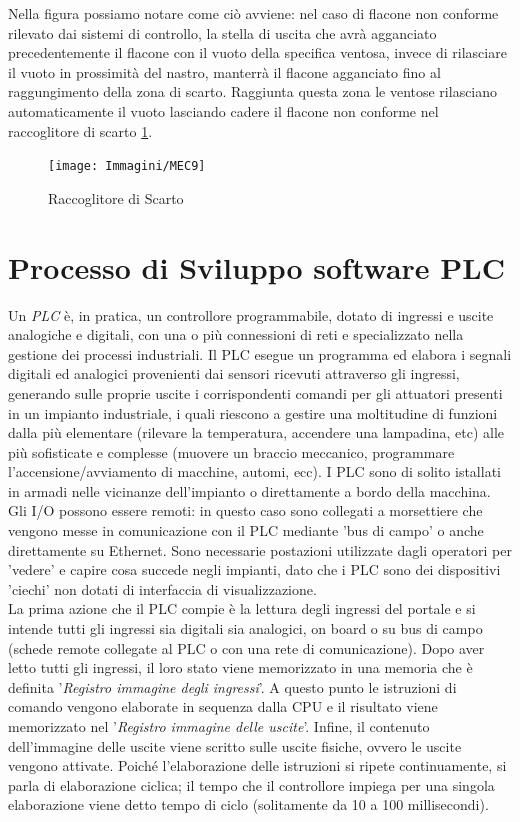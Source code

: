\documentclass[12pt, a4paper, oneside]{book}
\begin{document}
Nella figura possiamo notare come ciò avviene: nel caso di flacone non conforme rilevato dai sistemi di controllo, la stella di uscita che avrà agganciato precedentemente il flacone con il vuoto della specifica ventosa, invece di rilasciare il vuoto in prossimità del nastro, manterrà il flacone agganciato fino al raggungimento della zona di scarto. Raggiunta questa zona le ventose rilasciano automaticamente il vuoto lasciando cadere il flacone non conforme nel raccoglitore di scarto \ref{mec9}. 

\begin{figure}[H]
	\centering
	\texttt{[image: Immagini/MEC9]}
	\label{mec9}
	\caption{ Raccoglitore di Scarto}
\end{figure}
 
\chapter{Processo di Sviluppo software PLC}
Un \textit{PLC} è, in pratica, un controllore programmabile, dotato di ingressi e uscite analogiche e digitali, con una o più connessioni di reti e specializzato nella gestione dei processi industriali. Il PLC esegue un programma ed elabora i segnali digitali ed analogici provenienti dai sensori ricevuti attraverso gli ingressi, generando sulle proprie uscite i corrispondenti comandi per gli attuatori presenti in un impianto industriale, i quali riescono a gestire una moltitudine di funzioni dalla più elementare (rilevare la temperatura, accendere una lampadina, etc) alle più sofisticate e complesse (muovere un braccio meccanico, programmare l'accensione/avviamento di macchine, automi, ecc). 
I PLC sono di solito istallati in armadi nelle vicinanze dell'impianto o direttamente a bordo della macchina. Gli I/O possono essere remoti: in questo caso sono collegati a morsettiere che vengono messe in comunicazione con il PLC mediante 'bus di campo' o anche direttamente su Ethernet. Sono necessarie postazioni utilizzate dagli operatori per 'vedere' e capire cosa succede negli impianti, dato che i PLC sono dei dispositivi 'ciechi' non dotati di interfaccia di visualizzazione.
\\La prima azione che il PLC compie è la lettura degli ingressi del portale e si intende tutti gli ingressi sia digitali sia analogici, on board o su bus di campo (schede remote collegate al PLC o con una rete di comunicazione). Dopo aver letto tutti gli ingressi, il loro stato viene memorizzato in una memoria che è definita '\textit{Registro immagine degli ingressi}'. A questo punto le istruzioni di comando vengono elaborate in sequenza dalla CPU e il risultato viene memorizzato nel '\textit{Registro immagine delle uscite}'. Infine, il contenuto dell'immagine delle uscite viene scritto sulle uscite fisiche, ovvero le uscite vengono attivate. Poiché l'elaborazione delle istruzioni si ripete continuamente, si parla di elaborazione ciclica; il tempo che il controllore impiega per una singola elaborazione viene detto tempo di ciclo (solitamente da 10 a 100 millisecondi).
\end{document}
